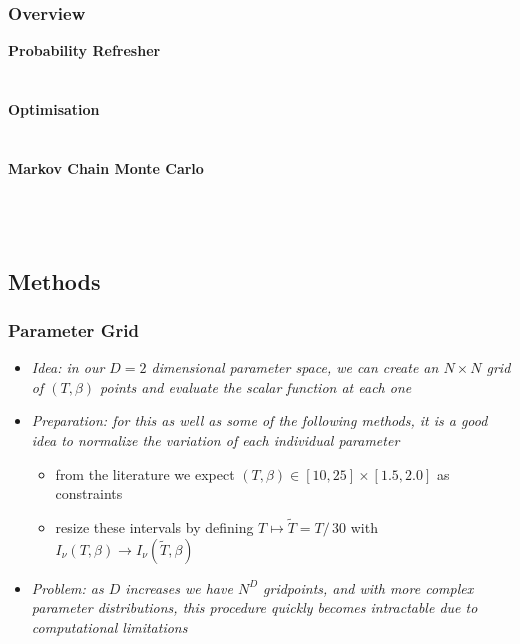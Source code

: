 	\begin{frame}
		\frametitle{Overview}
		\bfseries{Probability Refresher}\\[1.5pt]
		\hspace*{3ex}\\
		\hspace*{3ex}\\[3.0pt]
		\bfseries{Optimisation}\\[1.5pt]
		\hspace*{3ex}\\
		\hspace*{3ex}\\[3.0pt]
		\bfseries{Markov Chain Monte Carlo}\\[1.5pt]
		\hspace*{3ex}\\
		\hspace*{3ex}\\
		\hspace*{3ex}\\[3.0pt]
	\end{frame}

	\subsection{Methods}

	\begin{frame}
		\frametitle{Parameter Grid}
		\begin{itemize}
			\item<2-> \itshape{Idea:} in our $D=2$ dimensional parameter space, we can create an $N \times N$ grid of $(T, \beta)$ points
									  and evaluate the scalar function at each one
			\item<3-> \itshape{Preparation:} for this as well as some of the following methods, it is a good idea to normalize the variation
											 of each individual parameter
				\begin{itemize}
					\item<4-> from the literature we expect $(T,\beta) \in [10, 25] \times [1.5, 2.0]$ as constraints
					\item<5-> resize these intervals by defining $T \mapsto \tilde{T} = T / \, 30$ with $I_\nu(T, \beta) \rightarrow I_\nu(\tilde{T}, \beta)$
				\end{itemize}
			\item<6-> \itshape{Problem:} as $D$ increases we have $N^D$ gridpoints, and with more complex parameter distributions, this procedure
										 quickly becomes intractable due to computational limitations
		\end{itemize}
	\end{frame}

